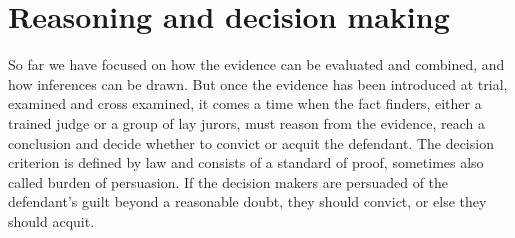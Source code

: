 \documentclass[10pt]{article}
\begin{document}
\section{Reasoning and decision making}
\label{sec:whenconv}
\label{sec:intexc}


So far we have focused on how the evidence can be evaluated and combined, and how inferences can be drawn. 
But once the evidence has been introduced at trial, examined and cross examined, it comes a time when the fact finders, either a 
trained judge or a group of lay jurors, must reason from the evidence, reach a conclusion and decide 
whether to convict or acquit the defendant. 
%
The decision criterion is defined by law 
and consists of a standard of proof, sometimes also called burden of persuasion. 
 If the decision makers are persuaded of the defendant's guilt beyond a reasonable doubt, 
 they should convict, or else they should acquit. 
\end{document}
